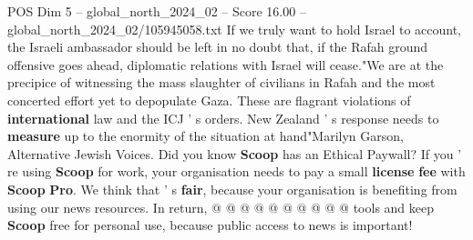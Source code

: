 \begin{textsample}{POS Dim 5 – global\_north\_2024\_02 – Score 16.00 – global\_north\_2024\_02/105945058.txt}
If we truly want to hold Israel to account, the Israeli ambassador should be left in no doubt that, if the Rafah ground offensive goes ahead, diplomatic relations with Israel will cease."We are at the precipice of witnessing the mass slaughter of civilians in Rafah and the most concerted effort yet to depopulate Gaza.
These are flagrant violations of \textbf{international} law and the ICJ ' s orders.
New Zealand ' s response needs to \textbf{measure} up to the enormity of the situation at hand"Marilyn Garson, Alternative Jewish Voices.
Did you know \textbf{Scoop} has an Ethical Paywall?
If you ' re using \textbf{Scoop} for work, your organisation needs to pay a small \textbf{license} \textbf{fee} with \textbf{Scoop} \textbf{Pro}.
We think that ' s \textbf{fair}, because your organisation is benefiting from using our news resources.
In return, @ @ @ @ @ @ @ @ @ @ tools and keep \textbf{Scoop} free for personal use, because public access to news is important!

\end{textsample}
